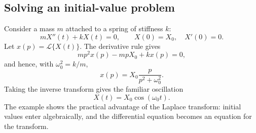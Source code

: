 \subsection{Solving an initial-value problem}

Consider a mass $m$ attached to a spring of stiffness $k$:
\begin{equation}
mX''(t)+kX(t)=0,
\qquad X(0)=X_0,\quad X'(0)=0.
\end{equation}
Let $x(p)=\mathcal{L}\{X(t)\}$. The derivative rule gives
\begin{equation}
mp^2x(p)-mpX_0+kx(p)=0,
\end{equation}
and hence, with $\omega_0^2=k/m$,
\begin{equation}
x(p)=X_0\frac{p}{p^2+\omega_0^2}.
\end{equation}
Taking the inverse transform gives the familiar oscillation
\begin{equation}
X(t)=X_0\cos(\omega_0t).
\end{equation}
The example shows the practical advantage of the Laplace transform: initial values enter algebraically, and the differential equation becomes an equation for the transform.